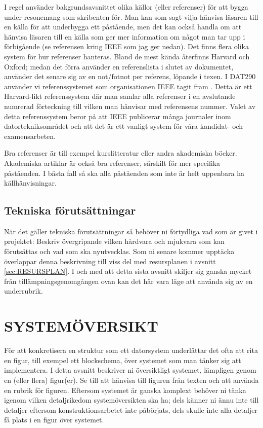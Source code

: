 \documentclass[a4paper]{article}
\begin{document}
I regel använder bakgrundsavsnittet olika källor (eller referenser) för
att bygga under resonemang som skribenten för. Man kan som sagt vilja
hänvisa läsaren till en källa för att underbygga ett påstående, men det
kan också handla om att hänvisa läsaren till en källa som ger mer
information om något man tar upp i förbigående (se referensen kring IEEE
som jag ger nedan). Det finns flera olika system för hur referenser
hanteras. Bland de mest kända återfinns Harvard och Oxford; medan det
förra använder en referenslista i slutet av dokumentet, använder det
senare sig av en not/fotnot per referens, löpande i texen. I DAT290
använder vi referenssystemet som organisationen IEEE tagit fram \cite{Hughen}. Detta
är ett Harvard-likt referenssystem där man samlar alla referenser i en
avslutande numrerad förteckning till vilken man hänvisar med referensens
nummer. Valet av detta referenssystem beror på att IEEE publicerar många
journaler inom datortekniksområdet och att det är ett vanligt system för
våra kandidat- och examensarbeten.

Bra referenser är till exempel kurslitteratur eller andra akademiska
böcker. Akademiska artiklar är också bra referenser, särskilt för mer
specifika påståenden. I bästa fall så ska alla påståenden som inte är
helt uppenbara ha källhänvisningar.


\subsection{Tekniska förutsättningar}

När det gäller tekniska förutsättningar så behöver ni förtydliga vad som
är givet i projektet: Beskriv övergripande vilken hårdvara och mjukvara
som kan förutsättas och vad som ska nyutvecklas. Som ni senare kommer
upptäcka överlappar denna beskrivning till viss del med resursplanen i
avsnitt \ref{sec:RESURSPLAN}. I och med att detta sista avsnitt skiljer sig
ganska mycket från tillämpningsgenomgången ovan kan det här vara läge
att använda sig av en underrubrik.



\section{SYSTEMÖVERSIKT}


För att konkretisera en struktur som ett datorsystem underlättar det
ofta att rita en figur, till exempel ett blockschema, över systemet som
man tänker sig att implementera. I detta avsnitt beskriver ni
översiktligt systemet, lämpligen genom en (eller flera) figur(er). Se
till att hänvisa till figuren från texten och att använda en rubrik för
figuren. Eftersom systemet är ganska komplext behöver ni tänka igenom
vilken detaljrikedom systemöversikten ska ha; dels känner ni ännu inte
till detaljer eftersom konstruktionsarbetet inte påbörjats, dels skulle
inte alla detaljer få plats i en figur över systemet.
\end{document}
